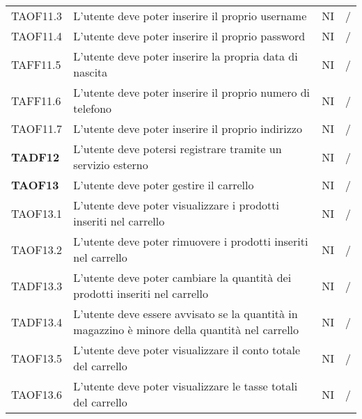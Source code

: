 \begin{center}
\begin{longtable}[!h]{p{60px} p{240px} p{35px} p{35px}}
        TAOF11.3        & L'utente deve poter inserire il proprio username                                                    & NI             & /              \\
        TAOF11.4        & L'utente deve poter inserire il proprio password                                                    & NI             & /              \\
        TAFF11.5        & L'utente deve poter inserire la propria data di nascita                                             & NI             & /              \\
        TAFF11.6        & L'utente deve poter inserire il proprio numero di telefono                                          & NI             & /              \\
        TAOF11.7        & L'utente deve poter inserire il proprio indirizzo                                                   & NI             & /              \\
        \textbf{TADF12} & L'utente deve potersi registrare tramite un servizio esterno                                        & NI             & /              \\
        \textbf{TAOF13} & L'utente deve poter gestire il carrello                                                             & NI             & /              \\
        TAOF13.1        & L'utente deve poter visualizzare i prodotti inseriti nel carrello                                   & NI             & /              \\
        TAOF13.2        & L'utente deve poter rimuovere i prodotti inseriti nel carrello                                      & NI             & /              \\
        TADF13.3        & L'utente deve poter cambiare la quantità dei prodotti inseriti nel carrello                         & NI             & /              \\
        TADF13.4        & L'utente deve essere avvisato se la quantità in magazzino è minore della quantità nel carrello      & NI             & /              \\
        TAOF13.5        & L'utente deve poter visualizzare il conto totale del carrello                                       & NI             & /              \\
        TAOF13.6        & L'utente deve poter visualizzare le tasse totali del carrello                                       & NI             & /              \\

\end{longtable}
\end{center}
